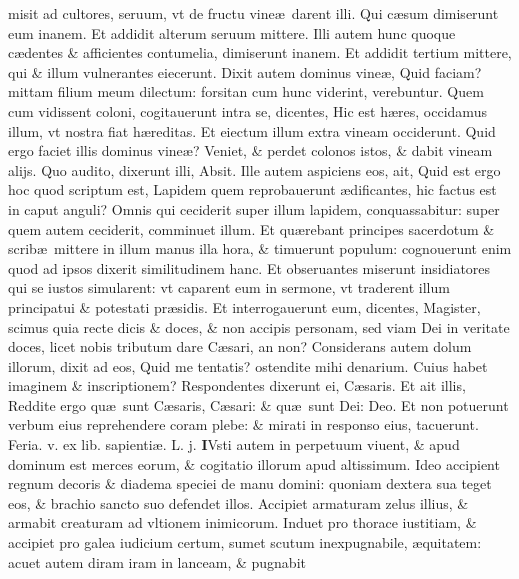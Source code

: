 \documentclass[a5paper,10pt]{book}
\def\rightmarginnote{%
	\lrmarginnote{\hskip\columnwidth \hskip -1em}}
\def\ae{æ}
\begin{document}
\begin{multicols*}{2}
misit ad cultores, seruum, vt de fructu vine\ae \ darent illi. Qui c\ae sum dimiserunt eum inanem.
Et addidit alterum seruum mittere.
\newline \indent Illi autem hunc quoque c\ae dentes \& afficientes contumelia, dimiserunt inanem. Et addidit tertium mittere, qui \& illum vulnerantes eiecerunt.
Dixit autem dominus vine\ae , Quid faciam? mittam filium meum dilectum: forsitan cum hunc viderint, verebuntur.
Quem cum vidissent coloni, cogitauerunt intra se, dicentes, Hic est h\ae res, occidamus illum, vt nostra fiat h\ae reditas.
Et eiectum illum extra vineam occiderunt. Quid ergo faciet illis dominus vine\ae ?
Veniet, \& perdet colonos istos, \& dabit vineam alijs. Quo audito, dixerunt illi, Absit. Ille autem aspiciens eos, ait, Quid est ergo hoc quod scriptum est, Lapidem quem reprobauerunt \ae dificantes, hic factus est in caput anguli?
Omnis qui ceciderit super illum lapidem, conquassabitur: super quem autem ceciderit, comminuet illum.
Et qu\ae rebant principes sacerdotum \& scrib\ae \ mittere in illum manus illa hora, \& timuerunt populum: cognouerunt enim quod ad ipsos dixerit similitudinem hanc.
Et obseruantes miserunt insidiatores qui se iustos simularent: vt caparent eum in sermone, vt traderent illum principatui \& potestati pr\ae sidis.
Et interrogauerunt eum, dicentes, Magister, scimus quia recte dicis \& doces, \& non accipis personam, sed viam Dei in veritate doces, licet nobis tributum dare C\ae sari, an non?
Considerans autem dolum illorum, dixit ad eos, Quid me tentatis? ostendite mihi denarium. Cuius habet imaginem \& inscriptionem? Respondentes dixerunt ei, C\ae saris.
Et ait illis, Reddite ergo qu\ae \ sunt C\ae saris, C\ae sari: \& qu\ae \ sunt Dei: Deo.
Et non potuerunt verbum eius reprehendere coram plebe: \& mirati in responso eius, tacuerunt.
\newline {} \color{red} \hypertarget{THU-TERTIA-POST-ADV}{Feria. v.} ex lib. sapienti\ae . L. j. \color{black}
\vspace{-1.25em}
\lettrine[lines=2]{\bfseries I}{}Vsti\rightmarginnote{ca. 5.} autem in perpetuum viuent, \& apud dominum est merces eorum, \& cogitatio illorum apud altissimum.
Ideo accipient regnum decoris \& diadema speciei de manu domini: quoniam dextera sua teget eos, \& brachio sancto suo defendet illos.
Accipiet armaturam zelus illius, \& armabit creaturam ad vltionem inimicorum. Induet pro thorace iustitiam, \& accipiet pro galea iudicium certum, sumet scutum inexpugnabile, \ae quitatem: acuet autem diram iram in lanceam, \& pugnabit

\end{multicols*}
\end{document}

